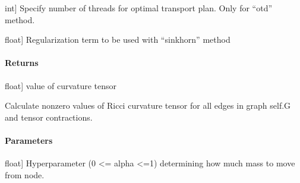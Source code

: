\documentclass[letterpaper,10pt,english]{sphinxmanual}
\begin{document}
\begin{fulllineitems}
\begin{fulllineitems}
\begin{description}
\sphinxlineitem{numThreads}{[}int{]}
\sphinxAtStartPar
Specify number of threads for optimal transport plan. Only for “otd” method.

\sphinxlineitem{reg}{[}float{]}
\sphinxAtStartPar
Regularization term to be used with “sinkhorn” method

\end{description}


\paragraph{Returns}
\label{\detokenize{graph_ricci_curvature:id5}}\begin{description}
\sphinxlineitem{curvature}{[}float{]}
\sphinxAtStartPar
value of curvature tensor

\end{description}

\end{fulllineitems}


\begin{fulllineitems}
\label{\detokenize{graph_ricci_curvature:graph_ricci_curvature.ollivier_ricci_curvature.OllivierRicciCurvature.calculate_ricci_curvature}}
\pysigstartsignatures
{}
\pysigstopsignatures
\sphinxAtStartPar
Calculate nonzero values of Ricci curvature tensor for all edges in
graph self.G and tensor contractions.


\paragraph{Parameters}
\label{\detokenize{graph_ricci_curvature:id6}}\begin{description}
\sphinxlineitem{alpha}{[}float{]}
\sphinxAtStartPar
Hyperparameter (0 \textless{}= alpha \textless{}=1) determining how much mass to move
from node.


\end{description}
\end{fulllineitems}
\end{fulllineitems}
\end{document}
